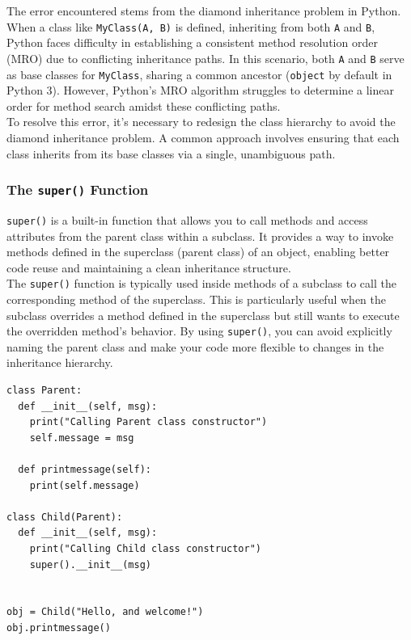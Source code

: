 The error encountered stems from the diamond inheritance problem in Python. When a class like \texttt{MyClass(A, B)} is defined, inheriting from both \texttt{A} and \texttt{B}, Python faces difficulty in establishing a consistent method resolution order (MRO) due to conflicting inheritance paths. In this scenario, both \texttt{A} and \texttt{B} serve as base classes for \texttt{MyClass}, sharing a common ancestor (\texttt{object} by default in Python 3). However, Python's MRO algorithm struggles to determine a linear order for method search amidst these conflicting paths.\\

To resolve this error, it's necessary to redesign the class hierarchy to avoid the diamond inheritance problem. A common approach involves ensuring that each class inherits from its base classes via a single, unambiguous path.


\newpage
\subsubsection{The \texttt{super()} Function}
\texttt{super()} is a built-in function that allows you to call methods and access attributes from the parent class within a subclass. It provides a way to invoke methods defined in the superclass (parent class) of an object, enabling better code reuse and maintaining a clean inheritance structure.\\

The \texttt{super()} function is typically used inside methods of a subclass to call the corresponding method of the superclass. This is particularly useful when the subclass overrides a method defined in the superclass but still wants to execute the overridden method's behavior. By using \texttt{super()}, you can avoid explicitly naming the parent class and make your code more flexible to changes in the inheritance hierarchy.

\begin{codebox}
\begin{verbatim}
class Parent:
  def __init__(self, msg):
    print("Calling Parent class constructor")
    self.message = msg

  def printmessage(self):
    print(self.message)

class Child(Parent):
  def __init__(self, msg):
    print("Calling Child class constructor")
    super().__init__(msg)


obj = Child("Hello, and welcome!")
obj.printmessage()
\end{verbatim}
\end{codebox}

